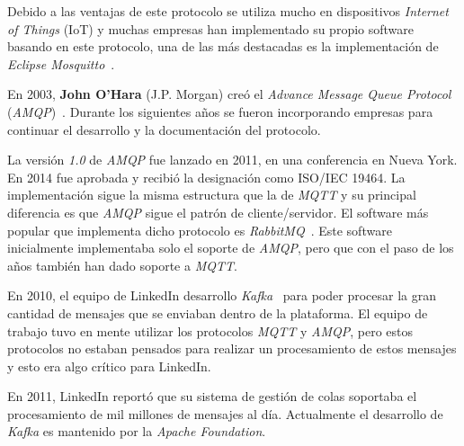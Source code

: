 
Debido a las ventajas de este protocolo se utiliza mucho en dispositivos \textit{Internet of Things} (IoT) y muchas empresas han implementado su propio software basando en este protocolo, una de las más destacadas es la implementación de \textit{Eclipse Mosquitto}~\cite{hillar2017mqtt}.


En 2003, \textbf{John O'Hara} (J.P. Morgan) creó el \textit{Advance Message Queue Protocol} (\textit{AMQP})~\cite{AMQP, AMQP_IEEE}. Durante los siguientes años se fueron incorporando empresas para continuar el desarrollo y la documentación del protocolo.

La versión \textit{1.0}  de \textit{AMQP} fue lanzado en 2011, en una conferencia en Nueva York. En 2014 fue aprobada y recibió la designación como ISO/IEC 19464. La implementación sigue la misma estructura que la de \textit{MQTT} y su principal diferencia es que \textit{AMQP} sigue el patrón de cliente/servidor. El software más popular que implementa dicho protocolo es \textit{RabbitMQ}~\cite{AMQP, AMQP_IEEE}. Este software inicialmente implementaba solo el soporte de \textit{AMQP}, pero que con el paso de los años también han dado soporte a \textit{MQTT}.

En 2010, el equipo de LinkedIn desarrollo \textit{Kafka}~\cite{kreps2011kafka} para poder procesar la gran cantidad de mensajes que se enviaban dentro de la plataforma. El equipo de trabajo tuvo en mente utilizar los protocolos \textit{MQTT} y \textit{AMQP}, pero estos protocolos no estaban pensados para realizar un procesamiento de estos mensajes y esto era algo crítico para LinkedIn.

En 2011, LinkedIn reportó que su sistema de gestión de colas soportaba el procesamiento de mil millones de mensajes al día. Actualmente el desarrollo de \textit{Kafka} es mantenido por la \textit{Apache Foundation}.
